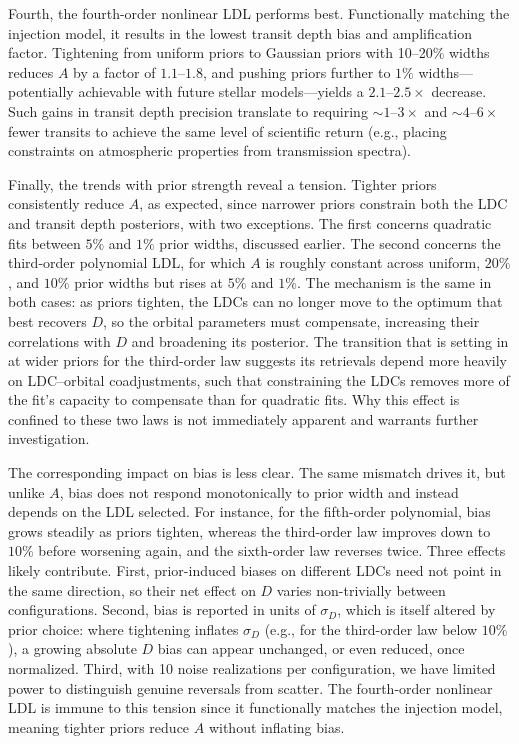 \documentclass[twocolumn]{aastex631}
\newcommand{\vtwo}[1]{{#1}}
\begin{document}
Fourth, the fourth-order nonlinear LDL performs best. Functionally matching the injection model, it results in the lowest transit depth bias and amplification factor. Tightening \vtwo{from uniform priors to Gaussian priors with 10--20\% widths} reduces $A$ by a factor of \vtwo{$1.1$--$1.8$}, and pushing priors further to $1\%$ \vtwo{widths}---potentially achievable with future stellar models---yields a \vtwo{$2.1$--$2.5\times$} decrease. Such gains in transit depth precision translate to requiring \vtwo{$\sim1$--$3\times$ and $\sim4$--$6\times$} fewer transits to achieve the same level of scientific return (e.g., placing constraints on atmospheric properties from transmission spectra).

\vtwo{Finally, the trends with prior strength reveal a tension. Tighter priors consistently reduce $A$, as expected, since narrower priors constrain both the LDC and transit depth posteriors, with two exceptions. The first concerns quadratic fits between $5\%$ and $1\%$ prior widths, discussed earlier. The second concerns the third-order polynomial LDL, for which $A$ is roughly constant across uniform, $20\%$, and $10\%$ prior widths but rises at $5\%$ and $1\%$. The mechanism is the same in both cases: as priors tighten, the LDCs can no longer move to the optimum that best recovers $D$, so the orbital parameters must compensate, increasing their correlations with $D$ and broadening its posterior. The transition that is setting in at wider priors for the third-order law suggests its retrievals depend more heavily on LDC--orbital coadjustments, such that constraining the LDCs removes more of the fit's capacity to compensate than for quadratic fits. Why this effect is confined to these two laws is not immediately apparent and warrants further investigation.}


\vtwo{The corresponding impact on bias is less clear. The same mismatch drives it, but unlike $A$, bias does not respond monotonically to prior width and instead depends on the LDL selected. For instance, for the fifth-order polynomial, bias grows steadily as priors tighten, whereas the third-order law improves down to $10\%$ before worsening again, and the sixth-order law reverses twice. Three effects likely contribute. First, prior-induced biases on different LDCs need not point in the same direction, so their net effect on $D$ varies non-trivially between configurations. Second, bias is reported in units of $\sigma_D$, which is itself altered by prior choice: where tightening inflates $\sigma_D$ (e.g., for the third-order law below $10\%$), a growing absolute $D$ bias can appear unchanged, or even reduced, once normalized. Third, with 10 noise realizations per configuration, we have limited power to distinguish genuine reversals from scatter. The fourth-order nonlinear LDL is immune to this tension since it functionally matches the injection model, meaning tighter priors reduce $A$ without inflating bias.}
\end{document}
